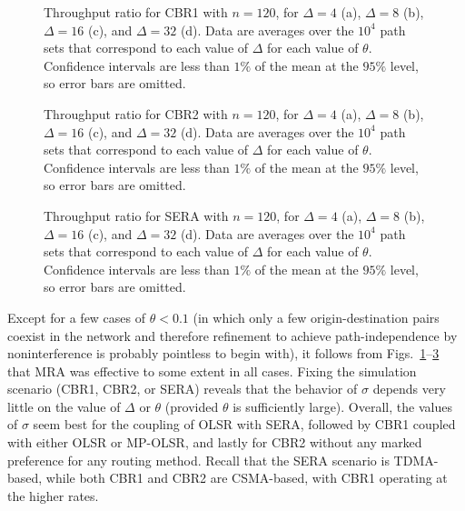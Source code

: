 \documentclass{article}
\begin{document}
\begin{figure}[p]
\centering
{}
\caption{Throughput ratio for CBR1 with $n=120$, for $\Delta=4$ (a), $\Delta=8$
(b), $\Delta=16$ (c), and $\Delta=32$ (d). Data are averages over the $10^4$
path sets that correspond to each value of $\Delta$ for each value of $\theta$.
Confidence intervals are less than $1\%$ of the mean at the $95\%$ level, so
error bars are omitted.}
\label{figure4}
\end{figure}

\begin{figure}[p]
\centering
{}
\caption{Throughput ratio for CBR2 with $n=120$, for $\Delta=4$ (a), $\Delta=8$
(b), $\Delta=16$ (c), and $\Delta=32$ (d). Data are averages over the $10^4$
path sets that correspond to each value of $\Delta$ for each value of $\theta$.
Confidence intervals are less than $1\%$ of the mean at the $95\%$ level, so
error bars are omitted.}
\label{figure5}
\end{figure}

\begin{figure}[p]
\centering
{}
\caption{Throughput ratio for SERA with $n=120$, for $\Delta=4$ (a), $\Delta=8$
(b), $\Delta=16$ (c), and $\Delta=32$ (d). Data are averages over the $10^4$
path sets that correspond to each value of $\Delta$ for each value of $\theta$.
Confidence intervals are less than $1\%$ of the mean at the $95\%$ level, so
error bars are omitted.}
\label{figure6}
\end{figure}

Except for a few cases of $\theta<0.1$ (in which only a few origin-destination
pairs coexist in the network and therefore refinement to achieve
path-independence by noninterference is probably pointless to begin with), it
follows from Figs.~\ref{figure4}--\ref{figure6} that MRA was effective to some
extent in all cases. Fixing the simulation scenario (CBR1, CBR2, or SERA)
reveals that the behavior of $\sigma$ depends very little on the value of
$\Delta$ or $\theta$ (provided $\theta$ is sufficiently large). Overall, the
values of $\sigma$ seem best for the coupling of OLSR with SERA, followed by
CBR1 coupled with either OLSR or MP-OLSR, and lastly for CBR2 without any marked
preference for any routing method. Recall that the SERA scenario is TDMA-based,
while both CBR1 and CBR2 are CSMA-based, with CBR1 operating at the higher
rates.
\end{document}
